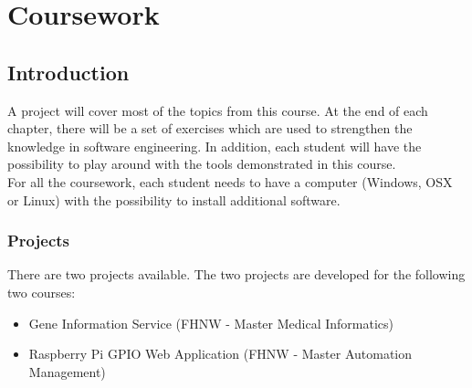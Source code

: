 \chapter{Coursework}
\section{Introduction}
A project will cover most of the topics from this course. At the end
of each chapter, there will be a set of exercises which are used to
strengthen the knowledge in software engineering. In addition, each
student will have the possibility to play around with the tools
demonstrated in this course.\\
For all the coursework, each student needs to have a computer
(Windows, OSX or Linux) with the possibility to install additional
software.

\subsection{Projects}
There are two projects available. The two projects are
developed for the following two courses:

\begin{itemize}
\item Gene Information Service (FHNW - Master Medical Informatics)
\item Raspberry Pi GPIO Web Application (FHNW - Master Automation Management)
\end{itemize}
